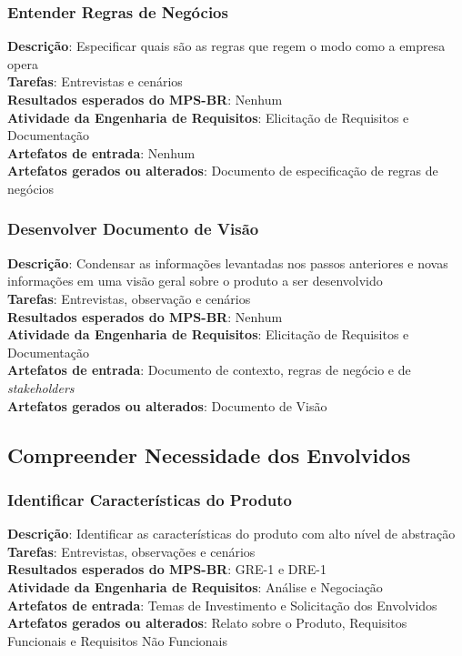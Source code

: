 \subsubsection{Entender Regras de Negócios}

\textbf{Descrição}: Especificar quais são as regras que regem o modo como a empresa opera\\
\textbf{Tarefas}: Entrevistas e cenários\\
\textbf{Resultados esperados do MPS-BR}: Nenhum\\
\textbf{Atividade da Engenharia de Requisitos}: Elicitação de Requisitos e Documentação\\
\textbf{Artefatos de entrada}: Nenhum\\
\textbf{Artefatos gerados ou alterados}: Documento de especificação de regras de negócios

\subsubsection{Desenvolver Documento de Visão}

\textbf{Descrição}: Condensar as informações levantadas nos passos anteriores e novas informações em uma visão geral sobre o produto a ser desenvolvido\\
\textbf{Tarefas}: Entrevistas, observação e cenários\\
\textbf{Resultados esperados do MPS-BR}: Nenhum\\
\textbf{Atividade da Engenharia de Requisitos}: Elicitação de Requisitos e Documentação\\
\textbf{Artefatos de entrada}: Documento de contexto, regras de negócio e de \textit{stakeholders}\\
\textbf{Artefatos gerados ou alterados}: Documento de Visão

\subsection{Compreender Necessidade dos Envolvidos}

\subsubsection{Identificar Características do Produto}

\textbf{Descrição}: Identificar as características do produto com alto nível de abstração\\
\textbf{Tarefas}: Entrevistas, observações e cenários\\
\textbf{Resultados esperados do MPS-BR}: GRE-1 e DRE-1\\
\textbf{Atividade da Engenharia de Requisitos}: Análise e Negociação\\
\textbf{Artefatos de entrada}: Temas de Investimento e Solicitação dos Envolvidos\\
\textbf{Artefatos gerados ou alterados}: Relato sobre o Produto, Requisitos Funcionais e Requisitos Não Funcionais

